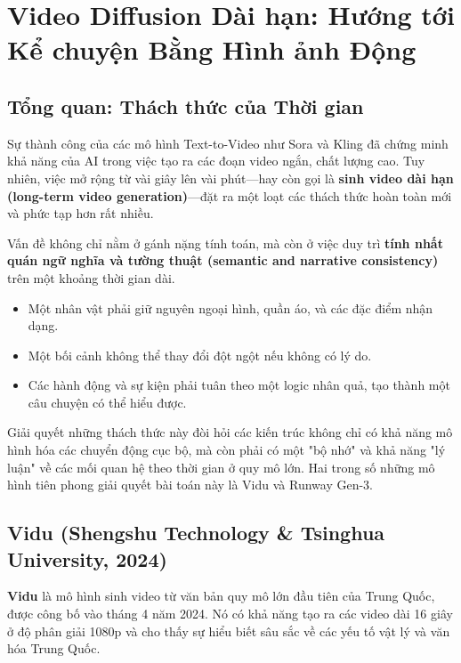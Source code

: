 \section{Video Diffusion Dài hạn: Hướng tới Kể chuyện Bằng Hình ảnh Động}
\label{sec:long_term_video_diffusion}

\subsection{Tổng quan: Thách thức của Thời gian}
\label{subsec:long_video_overview}
Sự thành công của các mô hình Text-to-Video như Sora và Kling đã chứng minh khả năng của AI trong việc tạo ra các đoạn video ngắn, chất lượng cao. Tuy nhiên, việc mở rộng từ vài giây lên vài phút—hay còn gọi là \textbf{sinh video dài hạn (long-term video generation)}—đặt ra một loạt các thách thức hoàn toàn mới và phức tạp hơn rất nhiều.

Vấn đề không chỉ nằm ở gánh nặng tính toán, mà còn ở việc duy trì \textbf{tính nhất quán ngữ nghĩa và tường thuật (semantic and narrative consistency)} trên một khoảng thời gian dài.
\begin{itemize}
	\item Một nhân vật phải giữ nguyên ngoại hình, quần áo, và các đặc điểm nhận dạng.
	\item Một bối cảnh không thể thay đổi đột ngột nếu không có lý do.
	\item Các hành động và sự kiện phải tuân theo một logic nhân quả, tạo thành một câu chuyện có thể hiểu được.
\end{itemize}
Giải quyết những thách thức này đòi hỏi các kiến trúc không chỉ có khả năng mô hình hóa các chuyển động cục bộ, mà còn phải có một "bộ nhớ" và khả năng "lý luận" về các mối quan hệ theo thời gian ở quy mô lớn. Hai trong số những mô hình tiên phong giải quyết bài toán này là Vidu và Runway Gen-3.

\subsection{Vidu (Shengshu Technology \& Tsinghua University, 2024)}
\label{subsec:vidu}
\textbf{Vidu} là mô hình sinh video từ văn bản quy mô lớn đầu tiên của Trung Quốc, được công bố vào tháng 4 năm 2024. Nó có khả năng tạo ra các video dài 16 giây ở độ phân giải 1080p và cho thấy sự hiểu biết sâu sắc về các yếu tố vật lý và văn hóa Trung Quốc.

